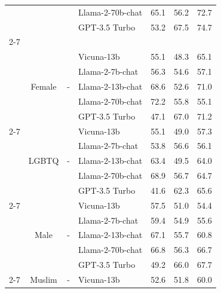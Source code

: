 \begin{longtable} {@{}ccclccc@{}}
&                         &                         &Llama-2-70b-chat & 65.1 & 56.2 & 72.7\\
&                         &                         &GPT-3.5 Turbo & 53.2 & 67.5 & 74.7\\ \cmidrule(l){2-7}
\multirow{10}{*}{\begin{tabular}[c]{@{}c@{}}CivilComments\\ \citep{wilds2021, borkan2019nuanced}\end{tabular}}   & \multirow{5}{*}{Female}      & \multirow{5}{*}{-} & Vicuna-13b & 55.1 & 48.3 & 65.1\\
&                         &                         &Llama-2-7b-chat & 56.3 & 54.6 & 57.1\\
&                         &                         &Llama-2-13b-chat & 68.6 & 52.6 & 71.0\\
&                         &                         &Llama-2-70b-chat & 72.2 & 55.8 & 55.1\\
&                         &                         &GPT-3.5 Turbo & 47.1 & 67.0 & 71.2\\ \cmidrule(l){2-7}
                         & \multirow{5}{*}{LGBTQ}      & \multirow{5}{*}{-} & Vicuna-13b & 55.1 & 49.0 & 57.3\\
&                         &                         &Llama-2-7b-chat & 53.8 & 56.6 & 56.1\\
&                         &                         &Llama-2-13b-chat & 63.4 & 49.5 & 64.0\\
&                         &                         &Llama-2-70b-chat & 68.9 & 56.7 & 64.7\\
&                         &                         &GPT-3.5 Turbo & 41.6 & 62.3 & 65.6\\ \cmidrule(l){2-7}
                         & \multirow{5}{*}{Male}      & \multirow{5}{*}{-} & Vicuna-13b & 57.5 & 51.0 & 54.4\\
&                         &                         &Llama-2-7b-chat & 59.4 & 54.9 & 55.6\\
&                         &                         &Llama-2-13b-chat & 67.1 & 55.7 & 60.8\\
&                         &                         &Llama-2-70b-chat & 66.8 & 56.3 & 66.7\\
&                         &                         &GPT-3.5 Turbo & 49.2 & 66.0 & 67.7\\ \cmidrule(l){2-7}
                         & \multirow{5}{*}{Muslim}      & \multirow{5}{*}{-} & Vicuna-13b & 52.6 & 51.8 & 60.0\\

\end{longtable}
